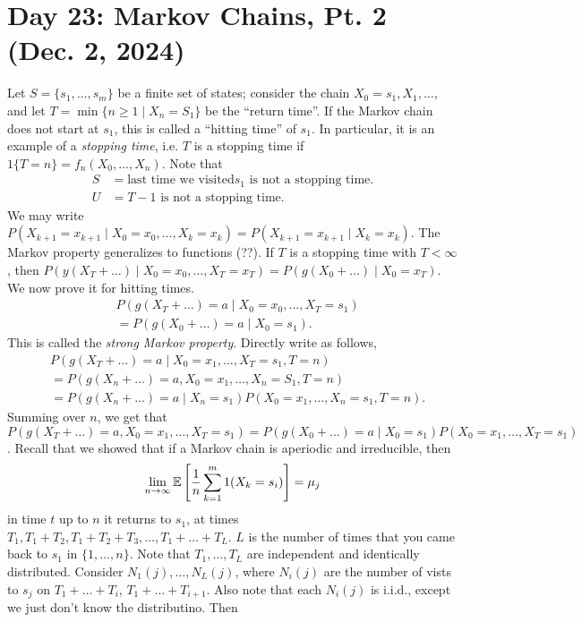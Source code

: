 \section{Day 23: Markov Chains, Pt. 2 (Dec. 2, 2024)}
Let $S = \{s_1, \dots, s_m\}$ be a finite set of states; consider the chain $X_0 = s_1, X_1, \dots$, and let $T = \min\{ n \geq 1 \mid X_n = S_1 \}$ be the ``return time''. If the Markov chain does not start at $s_1$, this is called a ``hitting time'' of $s_1$. In particular, it is an example of a \textit{stopping time}, i.e. $T$ is a stopping time if $1\{T = n\} = f_n(X_0, \dots, X_n)$. Note that
\begin{align*}
    S &= \text{last time we visited} s_1 \text{ is not a stopping time.} \\
    U &= T - 1 \text{ is not a stopping time.}
\end{align*}
We may write $P(X_{k+1} = x_{k+1} \mid X_0 = x_0, \dots, X_k = x_k) = P(X_{k+1} = x_{k+1} \mid X_k = x_k)$. The Markov property generalizes to functions (??). If $T$ is a stopping time with $T < \infty$, then $P(y(X_T + \dots) \mid X_0 = x_0, \dots, X_T = x_T) = P(g(X_0 + \dots) \mid X_0 = x_T)$. We now prove it for hitting times.
\begin{align*}
    & P(g(X_T + \dots) = a \mid X_0 = x_0, \dots, X_T = s_1) \\
    &= P(g(X_0 + \dots) = a \mid X_0 = s_1).
\end{align*}
This is called the \textit{strong Markov property}. Directly write as follows,
\begin{align*}
    & P(g(X_T + \dots) = a \mid X_0 = x_1, \dots, X_T = s_1, T = n) \\
    &= P(g(X_n + \dots) = a, X_0 = x_1, \dots, X_n = S_1, T = n) \\
    &= P(g(X_n + \dots) = a \mid X_n = s_1) P(X_0 = x_1, \dots, X_n = s_1, T = n). 
\end{align*}
Summing over $n$, we get that $P(g(X_T + \dots) = a, X_0 = x_1, \dots, X_T = s_1) = P(g(X_0 + \dots) = a \mid X_0 = s_1) P(X_0 = x_1, \dots, X_T = s_1)$. Recall that we showed that if a Markov chain is aperiodic and irreducible, then
\[ \lim_{n \to \infty} \mathbb E \left[ \frac{1}{n} \sum_{k=1}^m 1(X_k = s_i) \right] = \mu_j \] 
in time $t$ up to $n$ it returns to $s_1$, at times $T_1, T_1 + T_2, T_1 + T_2 + T_3, \dots, T_1 + \dots + T_L$. $L$ is the number of times that you came back to $s_1$ in $\{1, \dots, n\}$. Note that $T_1, \dots, T_L$ are independent and identically distributed. Consider $N_1(j), \dots, N_L(j)$, where $N_i(j)$ are the number of vists to $s_j$ on $T_1 + \dots + T_i$, $T_1 + \dots + T_{i+1}$. Also note that each $N_i(j)$ is i.i.d., except we just don't know the distributino. Then
